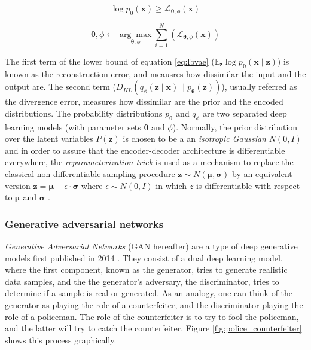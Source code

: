 \begin{equation}
\label{eq:vaelbasloss}
\log p_{0}(\mathbf{x}) \geq \mathcal{L}_{\mathbf{\theta}, \phi}\left(\mathbf{x}\right)
\end{equation}

\begin{equation}
\label{eq:vaeopt}
\mathbf{\theta}, \phi \leftarrow \underset{\mathbf{\theta}, \phi}{\arg \max } \sum_{i=1}^{N}\left(\mathcal{L}_{\mathbf{\theta}, \phi}(\mathbf{x})\right)
\end{equation}

The first term of the lower bound of equation \ref{eq:lbvae} ($\mathbb{E}_{\mathbf{z}} \log p_{\mathbf{\theta}}(\mathbf{x} \mid \mathbf{z})$) is known as the reconstruction error, and meausres how dissimilar the input and the output are. The second term ($D_{K L}\left(q_{\phi}(\mathbf{z} \mid \mathbf{x}) \| p_{\mathbf{\theta}}(\mathbf{z})\right)$), usually referred as the divergence error, measures how dissimilar are the prior and the encoded distributions. The probability distributions $p_\mathbf{\theta}$ and $q_\phi$ are two separated deep learning models (with parameter sets $\mathbf{\theta}$ and $\phi$). Normally, the prior distribution over the latent variables $P(\mathbf{z})$ is chosen to be a an \textit{isotropic Gaussian} $N(0,I)$ \autocite{wei2021} and in order to assure that the encoder-decoder architecture is differentiable everywhere, the \textit{reparameterization trick} is used as a mechanism to replace the classical non-differentiable sampling procedure $\mathbf{z} \sim N(\mathbf{\mu}, \mathbf{\sigma})$ by an equivalent version $\mathbf{z} = \mathbf{\mu} + \epsilon \cdot \mathbf{\sigma}$ where $\epsilon \sim N(0,I)$ in which $z$ is differentiable with respect to $\mathbf{\mu}$ and $\mathbf{\sigma}$ \autocite{kingma2019}.


\subsubsection{Generative adversarial networks}
\textit{Generative Adversarial Networks} (GAN hereafter) are a type of deep generative models first published in 2014 \autocite{Goodfellow2014}. They consist of a dual deep learning model, where the first component, known as the generator, tries to generate realistic data samples, and the the generator's adversary, the discriminator, tries to determine if a sample is real or generated. As an analogy, one can think of the generator as playing the role of a counterfeiter, and the discriminator playing the role of a policeman. The role of the counterfeiter is to try to fool the policeman, and the latter will try to catch the counterfeiter. Figure \ref{fig:police_counterfeiter} shows this process graphically.

